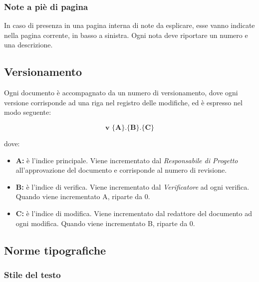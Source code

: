 \documentclass[NormediProgetto.tex]{subfiles}
\begin{document}
\subsubsection{Note a piè di pagina}

In caso di presenza in una pagina interna di note da esplicare, esse vanno indicate nella pagina corrente, in basso a sinistra. Ogni nota deve riportare un numero e una descrizione.

\subsection{Versionamento}

Ogni documento è accompagnato da un numero di versionamento, dove ogni versione corrisponde ad una riga nel registro delle modifiche, ed è espresso nel modo seguente:

\[\textbf{v $\biggl\{$A$\biggr\}$.$\biggl\{$B$\biggr\}$.$\biggl\{$C$\biggr\}$}\]

dove:

\begin{itemize}

\item{\textbf{A:}} è l'indice principale. Viene incrementato dal \textit{Responsabile di Progetto} all’approvazione del documento e 
corrisponde al numero di revisione.

\item{\textbf{B:}} è l'indice di verifica. Viene incrementato dal \textit{Verificatore} ad ogni verifica. Quando viene incrementato A, riparte da 0.

\item{\textbf{C:}} è l'indice di modifica. Viene incrementato dal redattore del documento ad ogni modifica. Quando viene incrementato B, riparte da 0.

\end{itemize}

\subsection{Norme tipografiche}

\subsubsection{Stile del testo}
\end{document}
